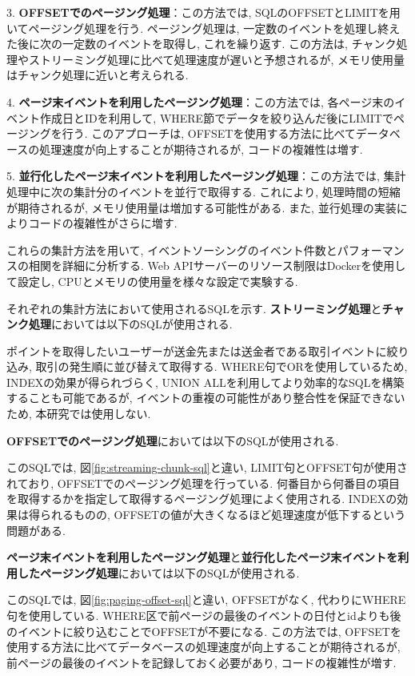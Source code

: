 \documentclass[../../../main]{subfiles}
\begin{document}
    3. \textbf{OFFSETでのページング処理}：この方法では, SQLのOFFSETとLIMITを用いてページング処理を行う. ページング処理は, 一定数のイベントを処理し終えた後に次の一定数のイベントを取得し, これを繰り返す. この方法は, チャンク処理やストリーミング処理に比べて処理速度が遅いと予想されるが, メモリ使用量はチャンク処理に近いと考えられる.

    4. \textbf{ページ末イベントを利用したページング処理}：この方法では, 各ページ末のイベント作成日とIDを利用して, WHERE節でデータを絞り込んだ後にLIMITでページングを行う. このアプローチは, OFFSETを使用する方法に比べてデータベースの処理速度が向上することが期待されるが, コードの複雑性は増す.

    5. \textbf{並行化したページ末イベントを利用したページング処理}：この方法では, 集計処理中に次の集計分のイベントを並行で取得する. これにより, 処理時間の短縮が期待されるが, メモリ使用量は増加する可能性がある. また, 並行処理の実装によりコードの複雑性がさらに増す.

    これらの集計方法を用いて, イベントソーシングのイベント件数とパフォーマンスの相関を詳細に分析する. Web APIサーバーのリソース制限はDockerを使用して設定し, CPUとメモリの使用量を様々な設定で実験する.

    それぞれの集計方法において使用されるSQLを示す. \textbf{ストリーミング処理}と\textbf{チャンク処理}においては以下のSQLが使用される.

    

    ポイントを取得したいユーザーが送金先または送金者である取引イベントに絞り込み, 取引の発生順に並び替えて取得する. WHERE句でORを使用しているため, INDEXの効果が得られづらく, UNION ALLを利用してより効率的なSQLを構築することも可能であるが, イベントの重複の可能性があり整合性を保証できないため, 本研究では使用しない.

    \textbf{OFFSETでのページング処理}においては以下のSQLが使用される.

    

    このSQLでは, 図\ref{fig:streaming-chunk-sql}と違い, LIMIT句とOFFSET句が使用されており, OFFSETでのページング処理を行っている. 何番目から何番目の項目を取得するかを指定して取得するページング処理によく使用される. INDEXの効果は得られるものの, OFFSETの値が大きくなるほど処理速度が低下するという問題がある.

    \textbf{ページ末イベントを利用したページング処理}と\textbf{並行化したページ末イベントを利用したページング処理}においては以下のSQLが使用される.

    

    このSQLでは, 図\ref{fig:paging-offset-sql}と違い, OFFSETがなく, 代わりにWHERE句を使用している. WHERE区で前ページの最後のイベントの日付とidよりも後のイベントに絞り込むことでOFFSETが不要になる. この方法では, OFFSETを使用する方法に比べてデータベースの処理速度が向上することが期待されるが, 前ページの最後のイベントを記録しておく必要があり, コードの複雑性が増す.
\end{document}
